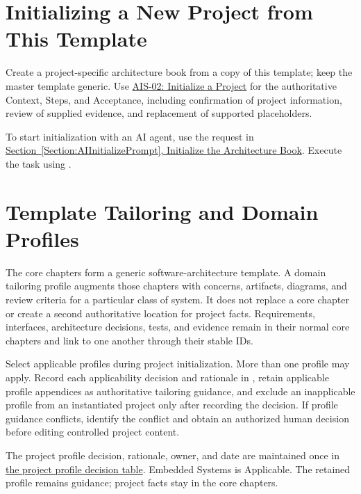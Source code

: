 \section{Initializing a New Project from This Template}
\label{Section:InitializeNewProject}
Create a project-specific architecture book from a copy of this template;
keep the master template generic. Use
\hyperref[Skill:AIS-02]{AIS-02: Initialize a Project} for the authoritative
Context, Steps, and Acceptance, including confirmation of project information,
review of supplied evidence, and replacement of supported placeholders.

To start initialization with an AI agent, use the request in
\hyperref[Section:AIInitializePrompt]{Section~\ref{Section:AIInitializePrompt},
Initialize the Architecture Book}. Execute the task using
.

\section{Template Tailoring and Domain Profiles}
\label{Section:DomainProfiles}
The core chapters form a generic software-architecture template. A domain
tailoring profile augments those chapters with concerns, artifacts, diagrams,
and review criteria for a particular class of system. It does not replace a
core chapter or create a second authoritative location for project facts.
Requirements, interfaces, architecture decisions, tests, and evidence remain
in their normal core chapters and link to one another through their stable IDs.

Select applicable profiles during project initialization. More than one
profile may apply. Record each applicability decision and rationale in
, retain applicable profile appendices as
authoritative tailoring guidance, and exclude an inapplicable profile from an
instantiated project only after recording the decision. If profile guidance
conflicts, identify the conflict and obtain an authorized human decision before
editing controlled project content.

The project profile decision, rationale, owner, and date are maintained once
in \hyperref[Table:ProjectDomainProfiles]{the project profile decision table}.
Embedded Systems is Applicable. The retained profile remains guidance;
project facts stay in the core chapters.


